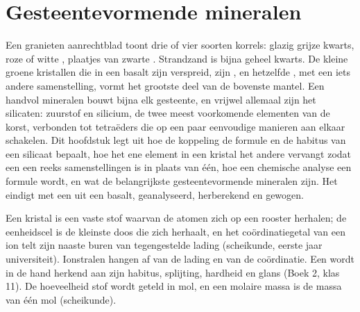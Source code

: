 \chapter{Gesteentevormende mineralen}\label{ch:b1:rock-forming-minerals}

Een granieten aanrechtblad toont drie of vier soorten korrels: glazig grijze kwarts, roze of witte
, plaatjes van zwarte . Strandzand is bijna geheel kwarts. De kleine groene kristallen die in een
basalt zijn verspreid, zijn , en hetzelfde , met een iets andere samenstelling, vormt het grootste
deel van de bovenste mantel. Een handvol mineralen bouwt bijna elk gesteente, en vrijwel allemaal zijn het
silicaten: zuurstof en silicium, de twee meest voorkomende elementen van de korst, verbonden tot tetraëders die
op een paar eenvoudige manieren aan elkaar schakelen. Dit hoofdstuk legt uit hoe de koppeling de formule en de habitus
van een silicaat bepaalt, hoe het ene element in een kristal het andere vervangt zodat een  een reeks
samenstellingen is in plaats van één, hoe een chemische analyse een formule wordt, en wat de belangrijkste
gesteentevormende mineralen zijn. Het eindigt met een  uit een basalt, geanalyseerd, herberekend en
gewogen.

\begin{recall}
Een kristal is een vaste stof waarvan de atomen zich op een rooster herhalen; de eenheidscel is de kleinste doos
die zich herhaalt, en het coördinatiegetal van een ion telt zijn naaste buren van tegengestelde lading (scheikunde,
eerste jaar universiteit). Ionstralen hangen af van de lading en van de coördinatie. Een  wordt in de hand
herkend aan zijn habitus, splijting, hardheid en glans (Boek 2, klas 11). De hoeveelheid stof wordt geteld in mol, en
een molaire massa is de massa van één mol (scheikunde).
\end{recall}

